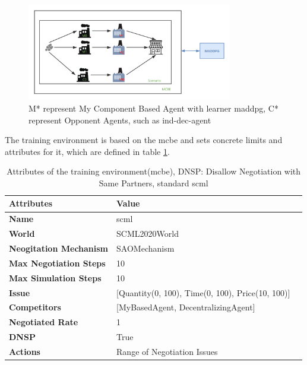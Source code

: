 \begin{figure}[htbp]
\centering
\includegraphics[width=0.80\textwidth]{./images/scenario-standard-scml.png}
\caption{M* represent My Component Based Agent with learner \gls{maddpg}, C* represent Opponent Agents, such as \gls{ind-dec-agent}}
\label{fig:scenario-standard-scml}
\end{figure}

The training environment is based on the \gls{mcbe} and sets concrete limits and attributes for it, which are defined in table \ref{tab:attributes-mcbe-dynamical-range-negotiation-issue}.

\begin{table}[htbp]
\centering
\begin{tabular}{l l l} \toprule
\bfseries \textbf{Attributes}    & \bfseries \textbf{Value}                                             \\ \midrule
\textbf{Name}                    & scml                                                                 \\
\textbf{World}                   & SCML2020World                                                        \\
\textbf{Neogitation Mechanism}   & SAOMechanism                                                         \\
\textbf{Max Negotiation Steps}   & 10                                                                   \\
\textbf{Max Simulation Steps}    & 10                                                                   \\
\textbf{Issue}             	     & [Quantity(0, 100), Time(0, 100), Price(10, 100)]                     \\
\textbf{Competitors}             & [MyBasedAgent, DecentralizingAgent]                                  \\
\textbf{Negotiated Rate}         &    1                                                                 \\
\textbf{DNSP}                    &    True                             \\
\textbf{Actions}                 & Range of Negotiation Issues                                          \\
\bottomrule
\end{tabular}
\caption{Attributes of the training environment(mcbe), DNSP: Disallow Negotiation with Same Partners, standard scml}
\label{tab:attributes-mcbe-dynamical-range-negotiation-issue}
\end{table}

